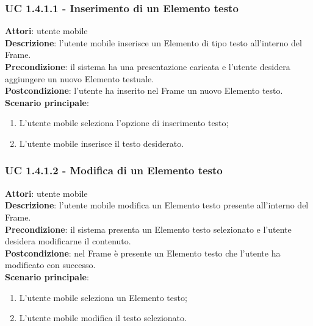 \subsubsection{UC 1.4.1.1 - Inserimento di un Elemento testo}{
	\label{uc1.4.1.1}
	\textbf{Attori}: utente mobile \\
	\textbf{Descrizione}: l'utente mobile inserisce un Elemento di tipo testo all'interno del Frame. \\
	\textbf{Precondizione}: il sistema ha una presentazione caricata e l'utente desidera aggiungere un nuovo Elemento testuale.	\\
	\textbf{Postcondizione}: l'utente ha inserito nel Frame un nuovo Elemento testo.	\\
	\textbf{Scenario principale}:
	\begin{enumerate}
		\item L'utente mobile seleziona l'opzione di inserimento testo;
		\item L'utente mobile inserisce il testo desiderato.
	\end{enumerate}
	}
\subsubsection{UC 1.4.1.2 - Modifica di un Elemento testo}{
	\label{uc1.4.1.2}
	\textbf{Attori}: utente mobile \\
	\textbf{Descrizione}: l'utente mobile modifica un Elemento testo presente all'interno del Frame. \\
	\textbf{Precondizione}: il sistema presenta un Elemento testo selezionato e l'utente desidera modificarne il contenuto.	\\
	\textbf{Postcondizione}: nel Frame è presente un Elemento testo che l'utente ha modificato con successo.	\\
	\textbf{Scenario principale}:
	\begin{enumerate}
		\item L'utente mobile seleziona un Elemento testo;
		\item L'utente mobile modifica il testo selezionato.
	\end{enumerate}
	}	
